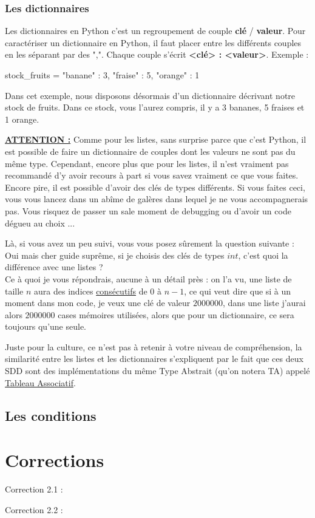 \documentclass[a4paper,12pt]{article}
\begin{document}
\subsubsection{Les dictionnaires}

Les dictionnaires en Python c'est un regroupement de couple \textbf{clé} / \textbf{valeur}. Pour caractériser un dictionnaire en Python, il faut placer entre { } les
différents couples en les séparant par des ",". Chaque couple s'écrit \textbf{<clé> : <valeur>}. Exemple :  
\begin{pythoncode}
    stock_fruits = { 
        "banane" : 3,
        "fraise" : 5,
        "orange" : 1
    }
\end{pythoncode}
Dans cet exemple, nous disposons désormais d'un dictionnaire décrivant notre stock de fruits. Dans ce stock, vous l'aurez compris, il y a 3 bananes, 5 fraises et 1 orange. 

{\color{red}
\textbf{\underline{ATTENTION :}} Comme pour les listes, sans surprise parce que c'est Python, il est possible de faire un dictionnaire de couples dont les valeurs ne sont
pas du même type. Cependant, encore plus que pour les listes, il n'est vraiment pas recommandé d'y avoir recours à part si vous savez vraiment ce que vous faites. \\
Encore pire, il est possible d'avoir des clés de types différents. Si vous faites ceci, vous vous lancez dans un abîme de galères dans lequel je ne vous accompagnerais pas.
Vous risquez de passer un sale moment de debugging ou d'avoir un code dégueu au choix ... \newline
}

Là, si vous avez un peu suivi, vous vous posez sûrement la question suivante : Oui mais cher guide suprême, si je choisis des clés de types $int$, c'est quoi la différence
avec une listes ? \\
Ce à quoi je vous répondrais, aucune à un détail près : on l'a vu, une liste de taille $n$ aura des indices \underline{consécutifs} de $0$ à $n-1$, ce qui veut dire que si à
un moment dans mon code, je veux une clé de valeur $2000000$, dans une liste j'aurai alors $2000000$ cases mémoires utilisées, alors que pour un dictionnaire, ce sera toujours
qu'une seule. 

{\color{cyan}
Juste pour la culture, ce n'est pas à retenir à votre niveau de compréhension, la similarité entre les listes et les dictionnaires s'expliquent par le fait que ces deux SDD
sont des implémentations du même Type Abstrait (qu'on notera TA) appelé \underline{Tableau Associatif}.
}

\subsection{Les conditions}

\newpage

\section{Corrections}

\hypertarget{AncreExo2.1}{Correction 2.1 : }
\hypertarget{AncreExo2.2}{Correction 2.2 : }
\end{document}
